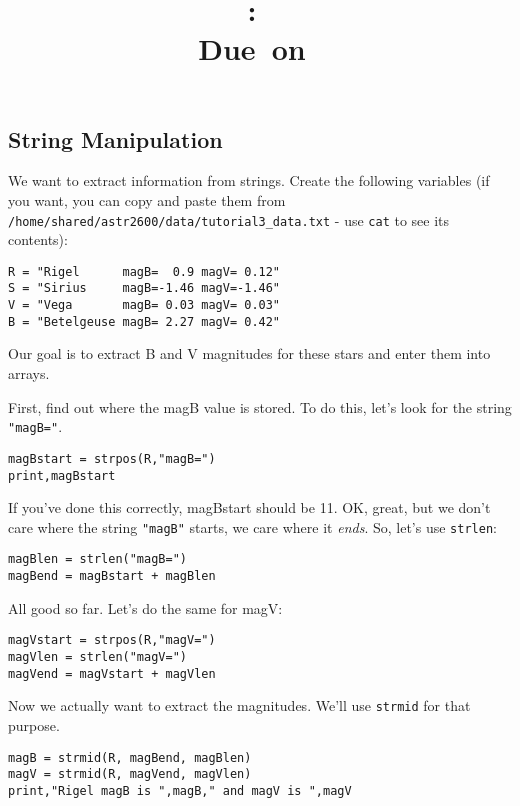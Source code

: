 \documentclass{article}
\title{\vspace{2in}\textmd{\textbf{\hmwkClass:\ \hmwkTitle}}\\\normalsize\vspace{0.1in}\small{Due\ on\ \hmwkDueDate}\\\vspace{0.1in}\large{}\vspace{3in}}
\date{}
\begin{document}
\begin{spacing}{1.0}
\newpage


\section{String Manipulation}

We want to extract information from strings.
Create the following variables (if you want, you can copy and paste them from
\verb|/home/shared/astr2600/data/tutorial3_data.txt| - use \verb|cat| to see
its contents):

\begin{lstlisting}
R = "Rigel      magB=  0.9 magV= 0.12"
S = "Sirius     magB=-1.46 magV=-1.46"
V = "Vega       magB= 0.03 magV= 0.03"
B = "Betelgeuse magB= 2.27 magV= 0.42"
\end{lstlisting}

Our goal is to extract B and V magnitudes for these stars and enter them into
arrays.

First, find out where the magB value is stored.  To do this, let's look for the string
\verb|"magB="|.

\begin{lstlisting}
magBstart = strpos(R,"magB=")
print,magBstart
\end{lstlisting}

If you've done this correctly, magBstart should be 11.  OK, great, but we don't care where
the string \verb|"magB"| starts, we care where it \emph{ends}.  So, let's use \verb|strlen|:

\begin{lstlisting}
magBlen = strlen("magB=")
magBend = magBstart + magBlen
\end{lstlisting}

All good so far.  Let's do the same for magV:

\begin{lstlisting}
magVstart = strpos(R,"magV=")
magVlen = strlen("magV=")
magVend = magVstart + magVlen
\end{lstlisting}

Now we actually want to extract the magnitudes.  We'll use \verb|strmid| for that purpose.

\begin{lstlisting}
magB = strmid(R, magBend, magBlen)
magV = strmid(R, magVend, magVlen)
print,"Rigel magB is ",magB," and magV is ",magV
\end{lstlisting}


\end{spacing}
\end{document}

